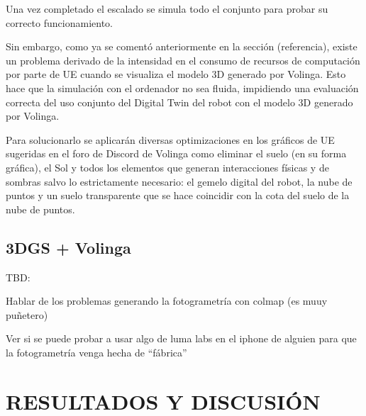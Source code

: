 \documentclass[a4paper, 12pt, spanish, twoside]{article}
\begin{document}
Una vez completado el escalado se simula todo el conjunto para probar su correcto funcionamiento. 

Sin embargo, como ya se comentó anteriormente en la sección (referencia), existe un problema derivado de la intensidad en el consumo de recursos de computación por parte de UE cuando se visualiza el modelo 3D generado por Volinga. Esto hace que la simulación con el ordenador no sea fluida, impidiendo una evaluación correcta del uso conjunto del Digital Twin del robot con el modelo 3D generado por Volinga. 

Para solucionarlo se aplicarán diversas optimizaciones en los gráficos de UE sugeridas en el foro de Discord de Volinga como eliminar el suelo (en su forma gráfica), el Sol y todos los elementos que generan interacciones físicas y de sombras salvo lo estrictamente necesario: el gemelo digital del robot, la nube de puntos y un suelo transparente que se hace coincidir con la cota del suelo de la nube de puntos. 

\subsection{3DGS + Volinga} 




TBD: 

Hablar de los problemas generando la fotogrametría con colmap (es muuy puñetero) 

Ver si se puede probar a usar algo de luma labs en el iphone de alguien para que la fotogrametría venga hecha de “fábrica” 

\clearpage





\newpage
\section{RESULTADOS Y DISCUSIÓN} \label{sec:resultados_y_discusion}

\clearpage

\end{document}
